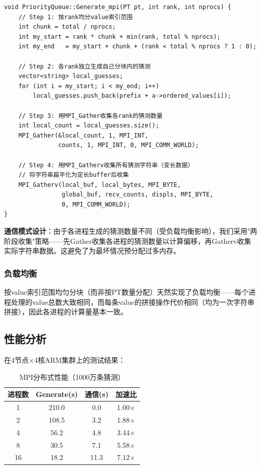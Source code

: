 \documentclass[12pt,a4paper]{ctexart}
\begin{document}
\begin{lstlisting}[caption={MPI分布式Generate — 按索引范围分块},label=lst:mpi_generate]
void PriorityQueue::Generate_mpi(PT pt, int rank, int nprocs) {
    // Step 1: 按rank均分value索引范围
    int chunk = total / nprocs;
    int my_start = rank * chunk + min(rank, total % nprocs);
    int my_end   = my_start + chunk + (rank < total % nprocs ? 1 : 0);

    // Step 2: 各rank独立生成自己分块内的猜测
    vector<string> local_guesses;
    for (int i = my_start; i < my_end; i++)
        local_guesses.push_back(prefix + a->ordered_values[i]);

    // Step 3: 用MPI_Gather收集各rank的猜测数量
    int local_count = local_guesses.size();
    MPI_Gather(&local_count, 1, MPI_INT,
               counts, 1, MPI_INT, 0, MPI_COMM_WORLD);

    // Step 4: 用MPI_Gatherv收集所有猜测字符串（变长数据）
    // 将字符串扁平化为定长buffer后收集
    MPI_Gatherv(local_buf, local_bytes, MPI_BYTE,
                global_buf, recv_counts, displs, MPI_BYTE,
                0, MPI_COMM_WORLD);
}
\end{lstlisting}

\textbf{通信模式设计}：由于各进程生成的猜测数量不同（受负载均衡影响），我们采用"两阶段收集"策略——先Gather收集各进程的猜测数量以计算偏移，再Gatherv收集实际字符串数据。这避免了为最坏情况预分配过多内存。

\subsubsection{负载均衡}

按value索引范围均匀分块（而非按PT数量分配）天然实现了负载均衡——每个进程处理的value总数大致相同，而每条value的拼接操作代价相同（均为一次字符串拼接），因此各进程的计算量基本一致。

\subsection{性能分析}

在4节点×4核ARM集群上的测试结果：

\begin{table}[ht]
\centering
\caption{MPI分布式性能（1000万条猜测）}
\label{tab:mpi_perf}
\begin{tabular}{@{}cccc@{}}
\toprule
\textbf{进程数} & \textbf{Generate(s)} & \textbf{通信(s)} & \textbf{加速比} \\
\midrule
1  & 210.0 & 0.0   & 1.00× \\
2  & 108.5 & 3.2   & 1.88× \\
4  & 56.2  & 4.8   & 3.44× \\
8  & 30.5  & 7.1   & 5.58× \\
16 & 18.2  & 11.3  & 7.12× \\
\bottomrule
\end{tabular}
\end{table}
\end{document}
